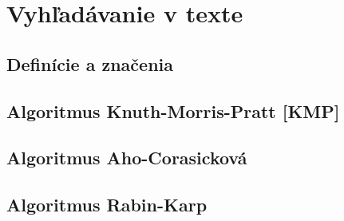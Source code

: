 \documentclass[../main.tex]{subfiles}
\begin{document}
\section{Vyhľadávanie v texte}
\subsection{Definície a značenia}

\subsection{Algoritmus Knuth-Morris-Pratt [KMP]}

\subsection{Algoritmus Aho-Corasicková}

\subsection{Algoritmus Rabin-Karp}
\end{document}

